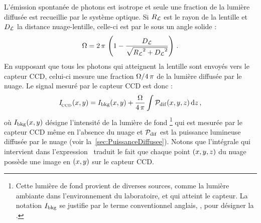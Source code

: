 L'émission spontanée de photons est isotrope et seule une fraction de la lumière diffusée est recueillie par le système optique. Si ${R_\mathcal{L}}$ est le rayon de la lentille et ${D_{\mathcal{L}}}$ la distance nuage-lentille, celle-ci est  par le \n sous un angle solide %
%
:
\[
{\Omega} = 2\,\pi\,\left( 1-\frac{{D_{\mathcal{L}}}}{\sqrt{{R_\mathcal{L}}^2+{D_{\mathcal{L}}}^2}} \right)
\, .
\]
En supposant que tous les photons qui atteignent la lentille sont envoyés vers le capteur CCD, celui-ci mesure une fraction ${{{\Omega}} / {4\,\pi}}$ de la lumière diffusée par le nuage.
%
Le signal mesuré par le capteur CCD est donc%
:
{\AjouteLigne}
\begin{equation}
	\Iccdxy 
	= \Ibackxy + \FractionAngleSolide \, \Integrale{{\Pdif\xyz}}{\dz} 
	\virguleformule
	\label{eq:IccdFluoPdif}
\end{equation} 
où ${{{I}_{\rm bkg}}(x,y)}$ désigne l'intensité de la lumière de fond%
\footnote{Cette lumière de fond provient de diverses sources, comme la lumière ambiante dans l'environnement du laboratoire, et qui atteint le capteur. La notation ${{I}_{\rm bkg}}$ se justifie par le terme conventionnel anglais, , pour désigner la .}
qui est mesurée par le capteur CCD même en l'absence du nuage et ${{\mathcal{P}_{\rm dif}}}$ est la puissance lumineuse diffusée par le nuage (voir la~\autoref{sec:PuissanceDiffusee}).
Notons que l'intégrale qui intervient dans l'expression~ traduit le fait que chaque point $(x,y,z)$ du nuage possède une image en $(x,y)$ sur le capteur CCD. 



